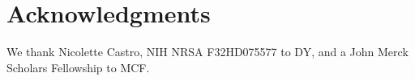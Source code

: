 \documentclass[man,floatsintext]{apa6}
\begin{document}
\section{Acknowledgments}

We thank Nicolette Castro, NIH NRSA F32HD075577 to DY, and a John Merck Scholars Fellowship to MCF.



\end{document}

